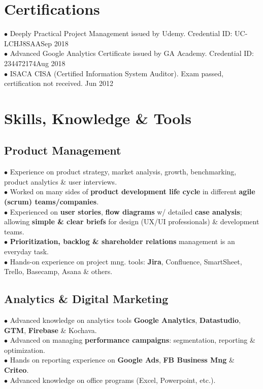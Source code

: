 \documentclass[11pt,twoside,a4paper]{article}
\begin{document}
  \section{Certifications}
    $\bullet$ Deeply Practical Project Management issued by Udemy. Credential ID: UC-LCHJ8SAA\hfill Sep 2018\\
    $\bullet$ Advanced Google Analytics Certificate issued by GA Academy. Credential ID: 234472174\hfill Aug 2018\\
    $\bullet$ ISACA CISA (Certified Information System Auditor). Exam passed, certification not received. \hfill Jun 2012
  \section{Skills, Knowledge \& Tools}
    \subsection{Product Management}
      $\bullet$ Experience on product strategy, market analysis, growth, benchmarking, product analytics \& user interviews.\\
      $\bullet$ Worked on many sides of \textbf{product development life cycle} in different \textbf{agile (scrum) teams/companies}.\\
      $\bullet$ Experienced on \textbf{user stories}, \textbf{flow diagrams} w/ detailed \textbf{case analysis}; allowing \textbf{simple \& clear briefs} for design (UX/UI professionals) \& development teams.\\
      $\bullet$ \textbf{Prioritization, backlog \& shareholder relations} management is an everyday task.\\
      $\bullet$ Hands-on experience on project mng. tools: \textbf{Jira}, Confluence, SmartSheet, Trello, Basecamp, Asana \& others.
    \subsection{Analytics \& Digital Marketing}
      $\bullet$ Advanced knowledge on analytics tools \textbf{Google Analytics}, \textbf{Datastudio}, \textbf{GTM}, \textbf{Firebase} \& Kochava.\\
      $\bullet$ Advanced on managing \textbf{performance campaigns}: segmentation, reporting \& optimization.\\
      $\bullet$ Hands on reporting experience on \textbf{Google Ads}, \textbf{FB Business Mng} \& \textbf{Criteo}.\\
      $\bullet$ Advanced knowledge on office programs (Excel, Powerpoint, etc.).
\end{document}
